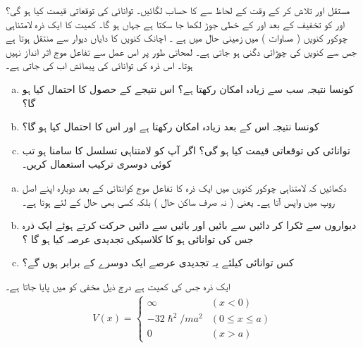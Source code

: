  مستقل اور  تلاش کر کے وقت کے لحاظ سے  کا حساب لگائیں۔ توانائی کی توقعاتی قیمت کیا ہو گی؟   اور  کو تخفیف کے بعد اور کے خطی جوڑ لکھا جا سکتا ہے جہاں  ہو گا۔
 کمیت کا ایک ذرہ لامتناہی چوکور کنویں  ( مساوات ) میں زمینی حال میں ہے ۔ اچانک کنویں کا دایاں دیوار  سے  منتقل ہوتا ہے جس سے کنویں  کی چوڑائی دگنی ہو جاتی ہے۔ لمحاتی طور پر اس عمل سے تفاعل موج اثر انداز نہیں ہوتا۔ اس ذرہ کی توانائی کی پیمائش اب کی جاتی ہے۔
\begin{enumerate}[a.]
\item
 کونسا نتیجہ سب سے زیادہ امکان رکھتا ہے؟ اس نتیجے کے حصول کا احتمال کیا ہو گا؟ 
\item
 کونسا نتیجہ اس کے بعد زیادہ امکان رکھتا ہے اور اس کا احتمال کیا ہو گا؟
\item 
توانائی کی توقعاتی قیمت کیا ہو گی؟  اگر آپ کو لامتناہی تسلسل کا سامنا ہو تب کوئی دوسری ترکیب استعمال کریں۔
\end{enumerate} 
\begin{enumerate}[a.]
\item 
 دکھائیں کہ لامتناہی چوکور کنویں  میں ایک ذرہ کا تفاعل موج کوانٹائی  کے بعد دوبارہ اپنے اصل روپ میں واپس آتا ہے۔ یعنی ( نہ صرف ساکن حال ) بلکہ کسی بھی حال کے لئے  ہوتا ہے۔ 
\item 
 دیواروں سے ٹکرا کر دائیں سے بائیں اور بائیں سے دائیں حرکت کرتے ہوئے ایک ذرہ جس کی توانائی  ہو کا کلاسیکی تجدیدی عرصہ کیا ہو گا ؟ 
\item 
 کس توانائی کیلئے یہ تجدیدی عرصے ایک دوسرے کے برابر ہوں گے؟
\end{enumerate} 
 ایک ذرہ جس کی کمیت  ہے درج ذیل مخفی کو میں پایا جاتا ہے۔ 
\begin{align*}
V(x)=
\begin{cases}
\infty & (x< 0)\\
-32\hslash^{2}/ma^{2} & (0\le x \le a)\\
0 & (x> a)
\end{cases}
\end{align*}

